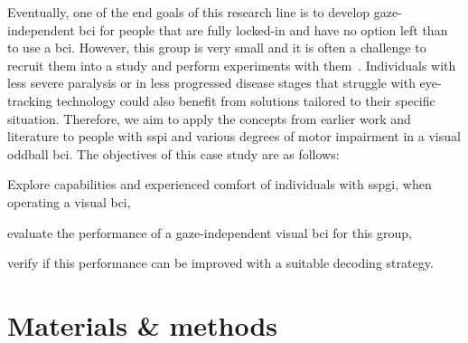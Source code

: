 Eventually, one of the end goals of this research line is to develop
gaze-independent \ac{bci} for people that are fully locked-in and have no option left than to use a \ac{bci}.
However, this group is very small and it is often a challenge to recruit them
into a study and perform experiments with them~\cite{Wolpaw2006}.
Individuals with less severe paralysis or in less progressed disease stages that struggle with
eye-tracking technology could also benefit from
solutions tailored to their specific situation.
Therefore, we aim to apply the concepts from earlier work and literature to
people with \ac{sspi} and various degrees of motor impairment in a visual oddball
\ac{bci}.
The objectives of this case study are as follows:
\begin{enumerate*}
  \item Explore capabilities and experienced comfort of individuals with
    \ac{sspgi}, when operating a visual \ac{bci},
  \item evaluate the performance of a gaze-independent visual \ac{bci} for this
    group,
  \item verify if this performance can be improved with a suitable decoding
    strategy.
\end{enumerate*}


\section{Materials \& methods}
